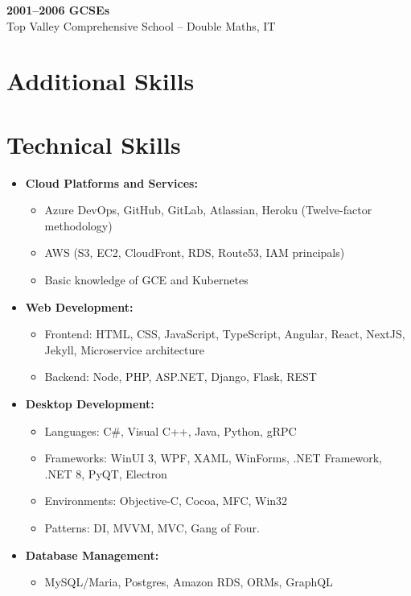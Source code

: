 \documentclass{article}
\begin{document}
\textbf{2001–2006 GCSEs} \\
Top Valley Comprehensive School – Double Maths, IT

\section*{Additional Skills}

\section*{Technical Skills}

\begin{itemize}
    \item \textbf{Cloud Platforms and Services:} 
        \begin{itemize}
            \item Azure DevOps, GitHub, GitLab, Atlassian, Heroku (Twelve-factor methodology)
            \item AWS (S3, EC2, CloudFront, RDS, Route53, IAM principals)
            \item Basic knowledge of GCE and Kubernetes
        \end{itemize}

    \item \textbf{Web Development:}
        \begin{itemize}
            \item Frontend: HTML, CSS, JavaScript, TypeScript, Angular, React, NextJS, Jekyll, Microservice architecture
            \item Backend: Node, PHP, ASP.NET, Django, Flask, REST
        \end{itemize}

    \item \textbf{Desktop Development:} 
        \begin{itemize}
            \item Languages: C\#, Visual C++, Java, Python, gRPC
            \item Frameworks: WinUI 3, WPF, XAML, WinForms, .NET Framework, .NET 8, PyQT, Electron
            \item Environments: Objective-C, Cocoa, MFC, Win32
            \item Patterns: DI, MVVM, MVC, Gang of Four.
        \end{itemize}

    \item \textbf{Database Management:}
        \begin{itemize}
            \item MySQL/Maria, Postgres, Amazon RDS, ORMs, GraphQL
        \end{itemize}


\end{itemize}
\end{document}

